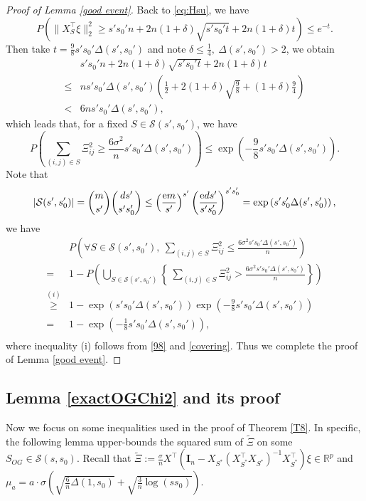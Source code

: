 \documentclass[12pt]{article}
\newtheorem{proof}{Proof}
\begin{document}
\begin{appendix}
\begin{proof}[Proof of Lemma \ref{good event}]
Back to \eqref{eq:Hsu}, we have
     \begin{equation}\label{ineq:t}
         P\left( \|X_S^\top\xi\|_2^2 \ge s's_0'n +
     2n(1+\delta)\sqrt{s's_0't} + 2 n(1+\delta) t \right) \le e^{-t}.
    \end{equation}
Then take $t =\frac98 s's_0'\Delta(s',s_0')$ and note $\delta \le \frac14,~\Delta(s',s_0')>2$, we obtain
\begin{align*}
         &s's_0'n + 2n(1+\delta)\sqrt{s's_0't} + 2 n(1+\delta) t \\
        \le & ns's_0' \Delta(s',s_0') \left( \frac12 + 2(1+\delta)\sqrt{\frac98} + (1+\delta)\frac94 \right) \\
        < & 6ns's_0' \Delta(s',s_0'),
\end{align*}
which leads that, for a fixed $ S \in \mathcal S (s',s_0')$, we have
    \begin{equation}\label{98}
         P\left( \sum_{(i,j) \in S}\Xi_{ij}^2 \ge \frac{6\sigma^2}{n}s's_0'\Delta(s',s_0') \right)
        \le \exp \left( -\frac98s's_0'\Delta(s',s_0') \right).
    \end{equation}
    Note that 
    \begin{equation}\label{covering}
        |\mathcal S (s',s_0')| = \binom{m}{s'} \binom{ds'}{s's_0'}
        \le \left( \frac{{\rm e} m}{s'}\right)^{s'} \left( \frac{{\rm e}ds'}{s's_0'}\right)^{s's_0'} 
        =\exp\left( s's_0'\Delta(s',s_0') \right),
    \end{equation}
    we have 
\begin{align*}
        & P\left( \forall S \in \mathcal S (s',s_0'),
            ~\sum_{(i,j)\in S} \Xi_{ij}^2\le \frac{6\sigma^2s's_0'\Delta(s',s_0') }n \right) \\
        = & 1 - P \left( \bigcup_{S \in \mathcal S (s',s_0')} \left\{  
            ~\sum_{(i,j)\in S} \Xi_{ij}^2 > \frac{6\sigma^2s's_0'\Delta(s',s_0') }n \right\} \right)\\
        \overset{(i)}{\ge} & 1 - \exp\left(s's_0'\Delta(s',s_0') \right) \exp \left( -\frac98s's_0'\Delta(s',s_0') \right)\\
        =& 1 - \exp \left( -\frac18 s's_0'\Delta(s',s_0') \right),\\
\end{align*}
    where inequality (i) follows from \eqref{98} and \eqref{covering}. Thus we complete the proof of Lemma \ref{good event}.
\end{proof}

\subsection{Lemma \ref{exactOGChi2} and its proof}
Now we focus on some inequalities used in the proof of Theorem \ref{T8}. 
In specific, the following lemma upper-bounds the squared sum of $\tilde \Xi$ on some $S_{OG}\in \mathcal S(s,s_0)$. Recall that $\tilde \Xi := \frac\sigma n X^\top \left(\mathbf I_n - X_{S^*} (X_{S^*}^\top X_{S^*})^{-1}X_{S^*}^\top \right) \xi \in \mathbb R^p$ and  $\mu_a = a\cdot\sigma \left( \sqrt{ \frac{6}{n} \Delta(1,s_0) } + \sqrt{ \frac{3}{n} \log(ss_0) } \right)$.



\end{appendix}
\end{document}

